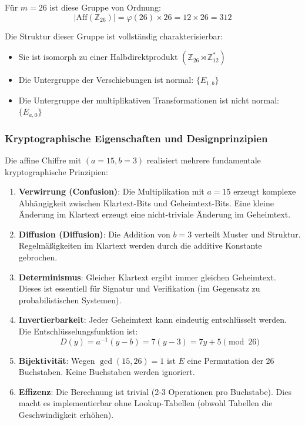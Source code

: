 ﻿\documentclass[12pt,a4paper]{article}
\begin{document}
	Für $m = 26$ ist diese Gruppe von Ordnung:
	\begin{equation}
		|\mathrm{Aff}(\mathbb{Z}_{26})| = \varphi(26) \times 26 = 12 \times 26 = 312
	\end{equation}
	
	Die Struktur dieser Gruppe ist vollständig charakterisierbar:
	\begin{itemize}
		\item Sie ist isomorph zu einer Halbdirektprodukt $(\mathbb{Z}_{26} \rtimes \mathbb{Z}_{12}^*)$
		\item Die Untergruppe der Verschiebungen ist normal: $\{E_{1, b}\}$
		\item Die Untergruppe der multiplikativen Transformationen ist nicht normal: $\{E_{a, 0}\}$
	\end{itemize}
	
	\subsubsection{Kryptographische Eigenschaften und Designprinzipien}
	
	Die affine Chiffre mit $(a=15, b=3)$ realisiert mehrere fundamentale kryptographische Prinzipien:
	
	\begin{enumerate}
		\item \textbf{Verwirrung (Confusion)}: Die Multiplikation mit $a = 15$ erzeugt komplexe Abhängigkeit zwischen Klartext-Bits und Geheimtext-Bits. Eine kleine Änderung im Klartext erzeugt eine nicht-triviale Änderung im Geheimtext.
		
		\item \textbf{Diffusion (Diffusion)}: Die Addition von $b = 3$ verteilt Muster und Struktur. Regelmäßigkeiten im Klartext werden durch die additive Konstante gebrochen.
		
		\item \textbf{Determinismus}: Gleicher Klartext ergibt immer gleichen Geheimtext. Dieses ist essentiell für Signatur und Verifikation (im Gegensatz zu probabilistischen Systemen).
		
		\item \textbf{Invertierbarkeit}: Jeder Geheimtext kann eindeutig entschlüsselt werden. Die Entschlüsselungsfunktion ist:
		\begin{equation}
			D(y) = a^{-1}(y - b) = 7(y - 3) = 7y + 5 \pmod{26}
		\end{equation}
		
		\item \textbf{Bijektivität}: Wegen $\gcd(15, 26) = 1$ ist $E$ eine Permutation der 26 Buchstaben. Keine Buchstaben werden ignoriert.
		
		\item \textbf{Effizenz}: Die Berechnung ist trivial (2-3 Operationen pro Buchstabe). Dies macht es implementierbar ohne Lookup-Tabellen (obwohl Tabellen die Geschwindigkeit erhöhen).
	\end{enumerate}
	
\end{document}
